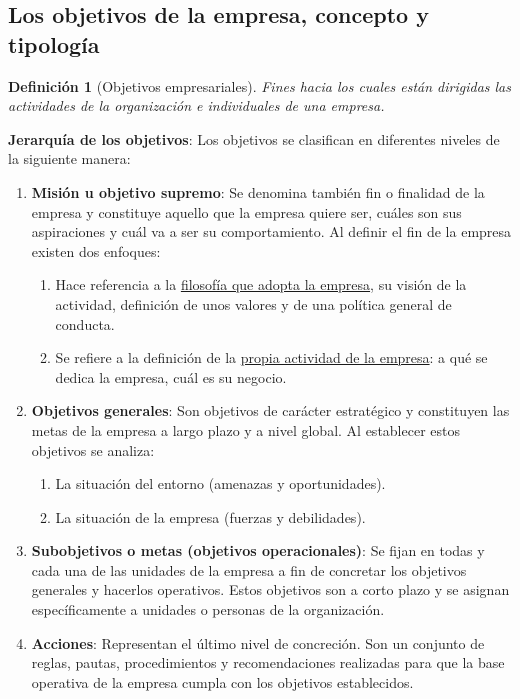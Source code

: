 \documentclass[12pt]{article}
\theoremstyle{definition_wo_parentheses}
\newtheorem{definicion}{Definición}[section]
\begin{document}
\subsection{Los objetivos de la empresa, concepto y tipología}
\begin{definicion}[Objetivos empresariales]
Fines hacia los cuales están dirigidas las actividades de la organización e individuales de una empresa.
\end{definicion}


\textbf{Jerarquía de los objetivos}: Los objetivos se clasifican en diferentes niveles de la siguiente manera:
\begin{enumerate}
\item \textbf{Misión u objetivo supremo}: Se denomina también fin o finalidad de la empresa y constituye aquello que la empresa quiere ser, cuáles son sus aspiraciones y cuál va a ser su comportamiento. Al definir el fin de la empresa existen dos enfoques:
\begin{enumerate}
\item Hace referencia a la \underline{filosofía que adopta la empresa}, su visión de la actividad, definición de unos valores y de una política general de conducta.
\item Se refiere a la definición de la \underline{propia actividad de la empresa}: a qué se dedica la empresa, cuál es su negocio.
\end{enumerate}
\item \textbf{Objetivos generales}: Son objetivos de carácter estratégico y constituyen las metas de la empresa a largo plazo y a nivel global. Al establecer estos objetivos se analiza:
\begin{enumerate}
\item La situación del entorno (amenazas y oportunidades).
\item La situación de la empresa (fuerzas y debilidades).
\end{enumerate}
\item \textbf{Subobjetivos o metas (objetivos operacionales)}: Se fijan en todas y cada una de las unidades de la empresa a fin de concretar los objetivos generales y hacerlos operativos. Estos objetivos son a corto plazo y se asignan específicamente a unidades o personas de la organización.
\item \textbf{Acciones}: Representan el último nivel de concreción. Son un conjunto de reglas, pautas, procedimientos y recomendaciones realizadas para que la base operativa de la empresa cumpla con los objetivos establecidos.
\end{enumerate}
\end{document}
